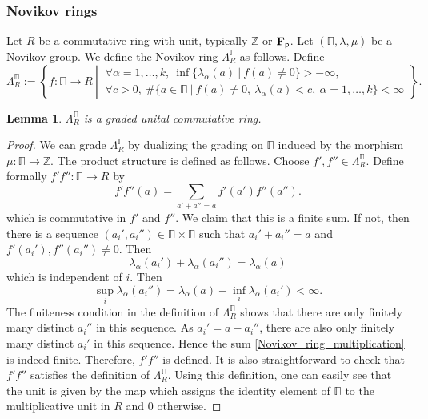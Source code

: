 \documentclass[reqno, 10pt]{amsart}
\numberwithin{equation}{section}
\numberwithin{equation}{section}
\newtheorem{lemma}[thm]{Lemma}
\theoremstyle{definition}
\theoremstyle{remark}
\newcommand{\beq}{\begin{equation}}
\newcommand{\eeq}{\end{equation}}
\newcommand{\beqn}{\begin{equation*}}
\newcommand{\eeqn}{\end{equation*}}
\newcommand{\mb}{\mathbb}
\newcommand{\fp}{{\bf F}_{\sf p}}
\begin{document}
\subsubsection{Novikov rings}

Let $R$ be a commutative ring with unit, typically ${\mb Z}$ or $\fp$. Let $(\mb\Pi, \lambda, \mu)$ be a Novikov group. We define the Novikov ring $\Lambda_R^{\mb\Pi}$ as follows. Define
\beq\label{defn_Novikov_ring}
\Lambda_R^{\mb\Pi}:= \left\{  f: \mb\Pi \to R %
\ \left|\ \begin{array}{l} \forall \alpha = 1, \ldots, k,\  \displaystyle \inf \{ \lambda_\alpha(a)\ |\ f(a) \neq 0 \} > -\infty,\\
\forall c>0,\ \# \big\{ a \in \mb\Pi \ |\ f(a) \neq 0,\ \lambda_\alpha (a) < c,\ \alpha = 1, \ldots, k \big\} < \infty \end{array} 
  \right. \right\}.
\eeq

\begin{lemma}
$\Lambda_R^{\mb \Pi}$ is a graded unital commutative ring.
\end{lemma}

\begin{proof}
We can grade $\Lambda_R^{\mb \Pi}$ by dualizing the grading on ${\mb \Pi}$ induced by the morphism $\mu: {\mb \Pi} \to {\mb Z}$. The product structure is defined as follows. Choose $f', f'' \in \Lambda_R^{\mb\Pi}$. Define formally  $f'f'': \mb\Pi \to R$ by
\beq\label{Novikov_ring_multiplication}
f'f'' (a) = \sum_{a' + a'' = a} f'(a') f''(a'').
\eeq
which is commutative in $f'$ and $f''$. We claim that this is a finite sum. If not, then there is a sequence $(a_i', a_i'') \in \mb\Pi \times \mb\Pi$ such that $a_i' + a_i'' =a$ and $f'(a_i'), f''(a_i'') \neq 0$. Then 
\beqn
\lambda_\alpha(a_i') + \lambda_\alpha(a_i'') = \lambda_\alpha(a)
\eeqn
which is independent of $i$. Then
\beqn
\sup_i \lambda_\alpha(a_i'') = \lambda_\alpha(a) - \inf_i \lambda_\alpha (a_i') < \infty. 
\eeqn
The finiteness condition in the definition of $\Lambda_R^{\mb\Pi}$ shows that there are only finitely many distinct $a_i''$ in this sequence. As $a_i' = a - a_i''$, there are also only finitely many distinct $a_i'$ in this sequence. Hence the sum \eqref{Novikov_ring_multiplication} is indeed finite. Therefore, $f'f''$ is defined. It is also straightforward to check that $f'f''$ satisfies the definition of $\Lambda_R^{\mb\Pi}$. Using this definition, one can easily see that the unit is given by the map which assigns the identity element of ${\mb\Pi}$ to the multiplicative unit in $R$ and $0$ otherwise.
\end{proof}
\end{document}
